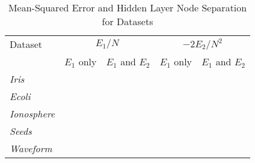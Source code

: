 \begin{table}[t]
  \centering
  \small
  \begin{tabular}{|l|r|r|r|r|}
    \hline
    Dataset & 
    \multicolumn{2}{c|}{$E_1/N$} & 
    \multicolumn{2}{c|}{$-2E_2/N^2$} \\
    \cline{2-5}
    & $E_1$ only & $E_1$ and $E_2$ & $E_1$ only & $E_1$ and $E_2$ \\
    \hline
    \textit{Iris} & & & & \\
    \textit{Ecoli} & & & & \\
    \textit{Ionosphere} & & & & \\
    \textit{Seeds} & & & & \\
    \textit{Waveform} & & & & \\
    \hline
  \end{tabular}
  \caption{Mean-Squared Error and Hidden Layer Node Separation for Datasets }
  \label{tab:e1_e2_avgs}  
\end{table}

